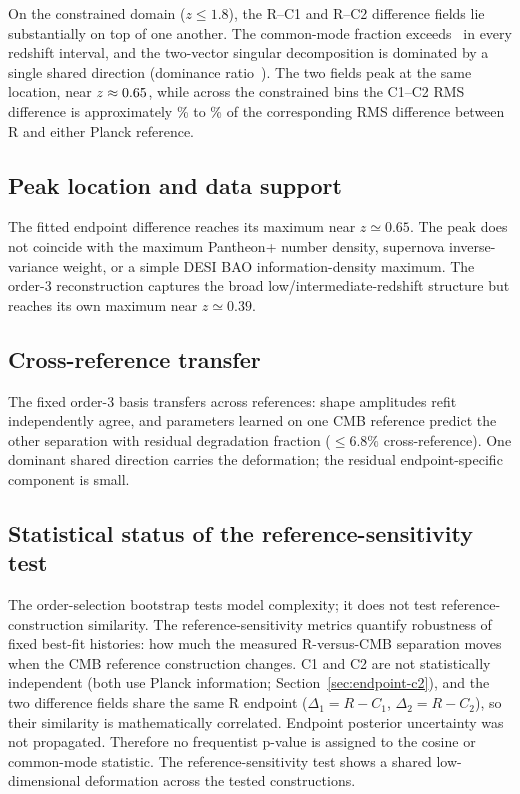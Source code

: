 On the constrained domain ($z\le1.8$), the R–C1 and R–C2 difference fields lie
substantially on top of one another. The common-mode fraction
exceeds~\GeometryCommonFractionMin{} in every redshift interval, and
the two-vector singular decomposition is dominated by a single
shared direction (dominance ratio~\GeometrySvdDominance{}). The two
fields peak at the same location, near
$z\approx0.65{}$, while across the constrained bins the
C1–C2 RMS difference is approximately \ReferenceSensitivityRatioMinPct{}\% to \ReferenceSensitivityRatioMaxPct{}\% of the corresponding RMS difference between R and either Planck reference.

\subsection{Peak location and data support}
\label{sec:peak-support}

The fitted endpoint difference reaches its maximum near
$z\simeq0.65$. The peak does not coincide with the maximum Pantheon+ number density, supernova inverse-variance weight, or a simple DESI BAO information-density maximum. The order-3 reconstruction captures the broad low/intermediate-redshift structure but reaches its own maximum near $z\simeq0.39$.

\subsection{Cross-reference transfer}

The fixed order-3 basis transfers across references: shape amplitudes
refit independently agree, and parameters learned on one CMB reference
predict the other separation with residual degradation fraction
\GeometryTransferDegradation{} ($\le 6.8\%$ cross-reference). One
dominant shared direction carries the deformation; the residual
endpoint-specific component is small.

\subsection{Statistical status of the reference-sensitivity test}
\label{sec:reference-sensitivity-stats}

The order-selection bootstrap tests model complexity; it does not
test reference-construction similarity. The reference-sensitivity metrics quantify robustness of fixed
best-fit histories: how much the measured R-versus-CMB separation moves
when the CMB reference construction changes. C1 and C2 are not
statistically independent (both use Planck information;
Section~\ref{sec:endpoint-c2}), and the two difference fields share
the same R endpoint ($\Delta_{1}=R-C_{1}$,
$\Delta_{2}=R-C_{2}$), so their similarity is mathematically
correlated. Endpoint posterior uncertainty was not propagated.
Therefore no frequentist p-value is assigned to the cosine or
common-mode statistic. The reference-sensitivity test shows a
shared low-dimensional deformation across the tested constructions.

